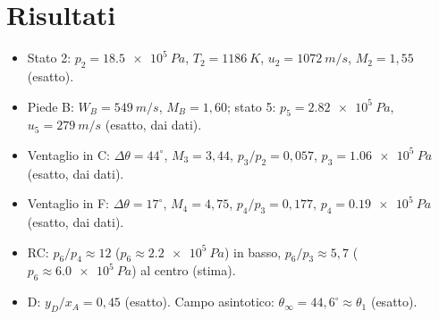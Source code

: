\section*{Risultati}
\begin{itemize}
\item Stato 2: $p_2=\SI{18.5e5}{Pa}$, $T_2=\SI{1186}{K}$, $u_2=\SI{1072}{m/s}$, $M_2=1{,}55$ (esatto).
\item Piede B: $W_B=\SI{549}{m/s}$, $M_B=1{,}60$; stato 5: $p_5=\SI{2.82e5}{Pa}$, $u_5=\SI{279}{m/s}$ (esatto, dai
  dati).
\item Ventaglio in C: $\Delta\theta=44^\circ$, $M_3=3{,}44$, $p_3/p_2=0{,}057$, $p_3=\SI{1.06e5}{Pa}$ (esatto, dai dati).
\item Ventaglio in F: $\Delta\theta=17^\circ$, $M_4=4{,}75$, $p_4/p_3=0{,}177$, $p_4=\SI{0.19e5}{Pa}$ (esatto, dai dati).
\item RC: $p_6/p_4\approx12$ ($p_6\approx\SI{2.2e5}{Pa}$) in basso, $p_6/p_3\approx5{,}7$ ($p_6\approx\SI{6.0e5}{Pa}$)
  al centro (stima).
\item D: $y_D/x_A=0{,}45$ (esatto). Campo asintotico: $\theta_\infty=44{,}6^\circ\approx\theta_1$ (esatto).
\end{itemize}

